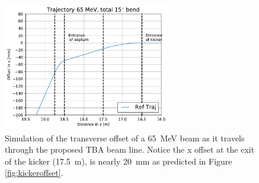 \begin{figure}
	\centering
	\includegraphics[width=0.65\textwidth]{./images/tba_trajectory}
	\caption{Simulation of the transverse offset of a \SI{65}{MeV} beam as 
		it travels through the proposed TBA beam line. Notice the x offset at the exit of the kicker (\SI{17.5}{m}), 
		is nearly \SI{20}{mm} as predicted in Figure \ref{fig:kickeroffset}.}
	\label{fig:beamtraj}
\end{figure}


